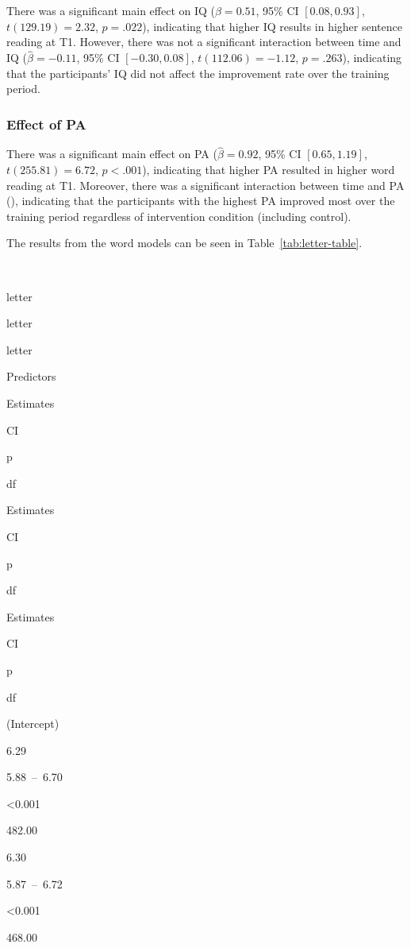 \documentclass[
  english,
  ,man]{apa6}
\begin{document}
There was a significant main effect on IQ (\(\hat{\beta} = 0.51\), 95\% CI \([0.08, 0.93]\), \(t(129.19) = 2.32\), \(p = .022\)), indicating that higher IQ results in higher sentence reading at T1. However, there was not a significant interaction between time and IQ (\(\hat{\beta} = -0.11\), 95\% CI \([-0.30, 0.08]\), \(t(112.06) = -1.12\), \(p = .263\)), indicating that the participants' IQ did not affect the improvement rate over the training period.

\hypertarget{effect-of-pa-2}{%
\subsubsection{Effect of PA}\label{effect-of-pa-2}}

There was a significant main effect on PA (\(\hat{\beta} = 0.92\), 95\% CI \([0.65, 1.19]\), \(t(255.81) = 6.72\), \(p < .001\)), indicating that higher PA resulted in higher word reading at T1. Moreover, there was a significant interaction between time and PA (), indicating that the participants with the highest PA improved most over the training period regardless of intervention condition (including control).

The results from the word models can be seen in Table~\ref{tab:letter-table}.

~

letter

letter

letter

Predictors

Estimates

CI

p

df

Estimates

CI

p

df

Estimates

CI

p

df

(Intercept)

6.29

5.88~--~6.70

\textless0.001

482.00

6.30

5.87~--~6.72

\textless0.001

468.00
\end{document}
